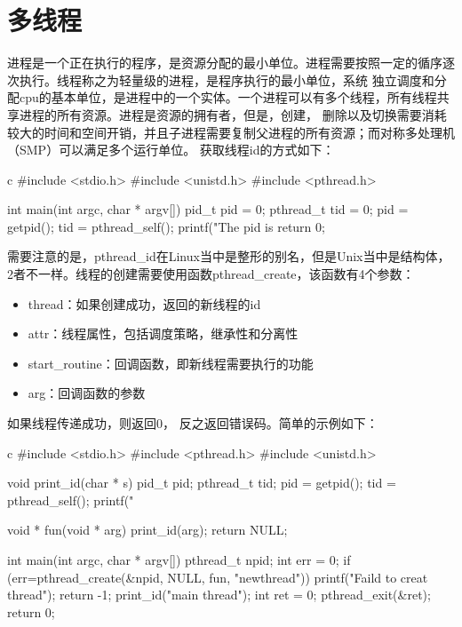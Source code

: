 \section{多线程}
进程是一个正在执行的程序，是资源分配的最小单位。进程需要按照一定的循序逐次执行。线程称之为轻量级的进程，是程序执行的最小单位，系统
独立调度和分配cpu的基本单位，是进程中的一个实体。一个进程可以有多个线程，所有线程共享进程的所有资源。进程是资源的拥有者，但是，创建，
删除以及切换需要消耗较大的时间和空间开销，并且子进程需要复制父进程的所有资源；而对称多处理机（SMP）可以满足多个运行单位。
获取线程id的方式如下：
\begin{code-block}{c}
#include <stdio.h>
#include <unistd.h>
#include <pthread.h>

int main(int argc, char * argv[])
{
        pid_t pid = 0;
        pthread_t tid = 0;
        pid = getpid();
        tid = pthread_self();
        printf("The pid is %
        return 0;
}
\end{code-block}

需要注意的是，pthread\_id在Linux当中是整形的别名，但是Unix当中是结构体，2者不一样。线程的创建需要使用函数pthread\_create，该函数有4个参数：
\begin{itemize}
  \item thread：如果创建成功，返回的新线程的id
  \item attr：线程属性，包括调度策略，继承性和分离性
  \item start\_routine：回调函数，即新线程需要执行的功能
  \item arg：回调函数的参数
\end{itemize}
如果线程传递成功，则返回0， 反之返回错误码。简单的示例如下：
\begin{code-block}{c}
#include <stdio.h>
#include <pthread.h>
#include <unistd.h>

void print_id(char * s)
{
        pid_t pid;
        pthread_t tid;
        pid = getpid();
        tid = pthread_self();
        printf("%
}

void * fun(void * arg)
{
        print_id(arg);
        return NULL;
}

int main(int argc, char * argv[])
{
        pthread_t npid;
        int err = 0;
        if (err=pthread_create(&npid, NULL, fun, "newthread"))
        {
                printf("Faild to creat thread\n");
                return -1;
        }
        print_id("main thread");
        int ret = 0;
        pthread_exit(&ret);
        return 0;
}
\end{code-block}

